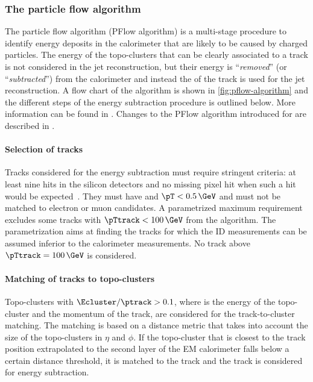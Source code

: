 



\subsubsection{The particle flow algorithm}
The particle flow algorithm (PFlow algorithm) is a multi-stage procedure to identify energy deposits in the calorimeter that are likely to be caused by charged particles. The energy of the topo-clusters that can be clearly associated to a track is not considered in the jet reconstruction, but their energy is ``\emph{removed}'' (or ``\emph{subtracted}'') from the calorimeter and instead the \pT of the track is used for the jet reconstruction. A flow chart of the algorithm is shown in \cref{fig:pflow-algorithm} and the different steps of the energy subtraction procedure is outlined below. More information can be found in . Changes to the PFlow algorithm introduced for \RunTwo are described in .

\paragraph{Selection of tracks} Tracks considered for the energy subtraction must require stringent criteria: at least nine hits in the silicon detectors and no missing pixel hit when such a hit would be expected~\cite{PERF-2015-09}. They must have  and $\pT < 0.5\,\GeV$ and must not be matched to electron or muon candidates. A parametrized maximum \pTtrack requirement excludes some tracks with $\pTtrack < 100\,\GeV$ from the algorithm. The parametrization aims at finding the tracks for which the ID measurements can be assumed inferior to the calorimeter measurements. No track above $\pTtrack = 100\,\GeV$ is considered.

\paragraph{Matching of tracks to topo-clusters} Topo-clusters with $\Ecluster / \ptrack > 0.1$, where \Ecluster is the energy of the topo-cluster and \ptrack the momentum of the track, are considered for the track-to-cluster matching. The matching is based on a distance metric that takes into account the size of the topo-clusters in $\eta$ and $\phi$. If the topo-cluster that is closest to the track position extrapolated to the second layer of the EM calorimeter falls below a certain distance threshold, it is matched to the track and the track is considered for energy subtraction.

